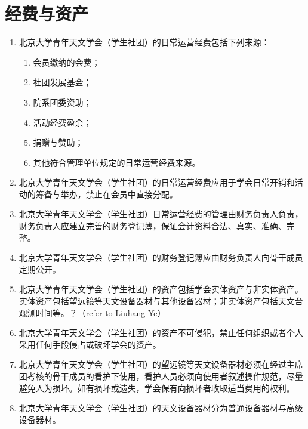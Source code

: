 \section{经费与资产}

\begin{enumerate}[resume]
    \item 北京大学青年天文学会（学生社团）的日常运营经费包括下列来源：
    
    \begin{enumerate}
        \item 会员缴纳的会费；
        \item 社团发展基金；
        \item 院系团委资助；
        \item 活动经费盈余；
        \item 捐赠与赞助；
        \item 其他符合管理单位规定的日常运营经费来源。
    \end{enumerate}
    
    \item 北京大学青年天文学会（学生社团）的日常运营经费应用于学会日常开销和活动的筹备与举办，禁止在会员中直接分配。
    
    \item 北京大学青年天文学会（学生社团）日常运营经费的管理由财务负责人负责，财务负责人应建立完善的财务登记薄，保证会计资料合法、真实、准确、完整。
    
    \item 北京大学青年天文学会（学生社团）的财务登记簿应由财务负责人向骨干成员定期公开。

    \item 北京大学青年天文学会（学生社团）的资产包括学会实体资产与非实体资产。实体资产包括望远镜等天文设备器材与其他设备器材；非实体资产包括天文台观测时间等。？（refer to Liuhang Ye）
    
    \item 北京大学青年天文学会（学生社团）的资产不可侵犯，禁止任何组织或者个人采用任何手段侵占或破坏学会的资产。
    
    \item 北京大学青年天文学会（学生社团）的望远镜等天文设备器材必须在经过主席团考核的骨干成员的看护下使用，看护人员必须向使用者叙述操作规范，尽量避免人为损坏。如有损坏或遗失，学会保有向损坏者收取适当费用的权利。
    
    \item 北京大学青年天文学会（学生社团）的天文设备器材分为普通设备器材与高级设备器材。
\end{enumerate}


